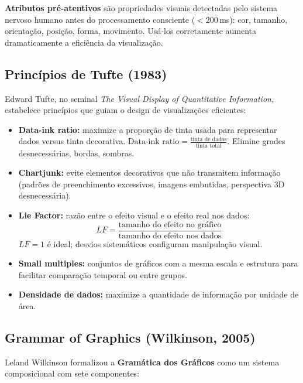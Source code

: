 \documentclass[12pt,a4paper]{article}
\begin{document}
\textbf{Atributos pré-atentivos} são propriedades visuais detectadas pelo sistema nervoso humano antes do processamento consciente ($< 200$\,ms): cor, tamanho, orientação, posição, forma, movimento. Usá-los corretamente aumenta dramaticamente a eficiência da visualização.

\subsection{Princípios de Tufte (1983)}

Edward Tufte, no seminal \textit{The Visual Display of Quantitative Information}, estabelece princípios que guiam o design de visualizações eficientes:

\begin{itemize}
  \item \textbf{Data-ink ratio:} maximize a proporção de tinta usada para representar dados versus tinta decorativa. $\text{Data-ink ratio} = \frac{\text{tinta de dados}}{\text{tinta total}}$. Elimine grades desnecessárias, bordas, sombras.
  \item \textbf{Chartjunk:} evite elementos decorativos que não transmitem informação (padrões de preenchimento excessivos, imagens embutidas, perspectiva 3D desnecessária).
  \item \textbf{Lie Factor:} razão entre o efeito visual e o efeito real nos dados:
    \begin{equation}
      LF = \frac{\text{tamanho do efeito no gráfico}}{\text{tamanho do efeito nos dados}}
    \end{equation}
    $LF = 1$ é ideal; desvios sistemáticos configuram manipulação visual.
  \item \textbf{Small multiples:} conjuntos de gráficos com a mesma escala e estrutura para facilitar comparação temporal ou entre grupos.
  \item \textbf{Densidade de dados:} maximize a quantidade de informação por unidade de área.
\end{itemize}

\subsection{Grammar of Graphics (Wilkinson, 2005)}

Leland Wilkinson formalizou a \textbf{Gramática dos Gráficos} como um sistema composicional com sete componentes:
\end{document}
